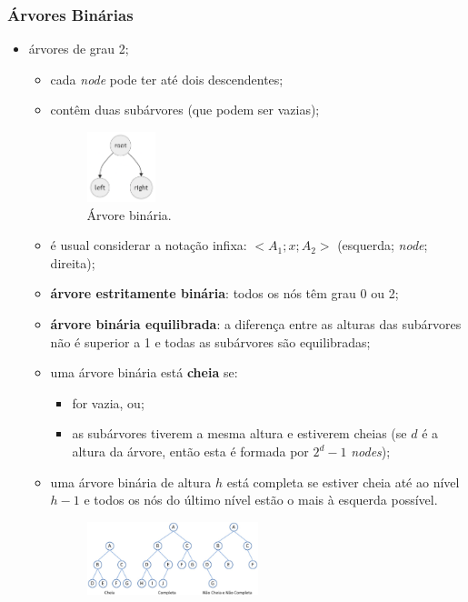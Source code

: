 \documentclass[a4paper, 12pt]{article}
\begin{document}
\subsubsection{Árvores Binárias}
\begin{itemize}
    \item árvores de grau 2;
    \begin{itemize}
        \item cada \emph{node} pode ter até dois descendentes;
        \item contêm duas subárvores (que podem ser vazias);
        \begin{center}
            \begin{figure}[h!]
                \centering
                \includegraphics[width=0.2\textwidth]{fig/t/tb.png}
                \caption{Árvore binária.}
            \end{figure}
        \end{center}
        \item é usual considerar a notação infixa: $\lt A_1;x;A_2\gt$ (esquerda; \emph{node}; direita);
        \item \textbf{árvore estritamente binária}: todos os nós têm grau 0 ou 2;
        \item \textbf{árvore binária equilibrada}: a diferença entre as alturas das subárvores não é superior a 1 e todas as subárvores são equilibradas;
        \item uma árvore binária está \textbf{cheia} se:
        \begin{itemize}
            \item for vazia, ou;
            \item as subárvores tiverem a mesma altura e estiverem cheias (se $d$ é a altura da árvore, então esta é formada por $2^d-1$ \emph{nodes});
        \end{itemize}
        \item uma árvore binária de altura $h$ está completa se estiver cheia até ao nível $h-1$ e todos os nós do último nível estão o mais à esquerda possível.
        \begin{center}
            \begin{figure}[h!]
                \centering
                \includegraphics[width=0.5\textwidth]{fig/t/btcompletefull.png}
            \end{figure}
        \end{center}
    \end{itemize}
\end{itemize}
\end{document}
